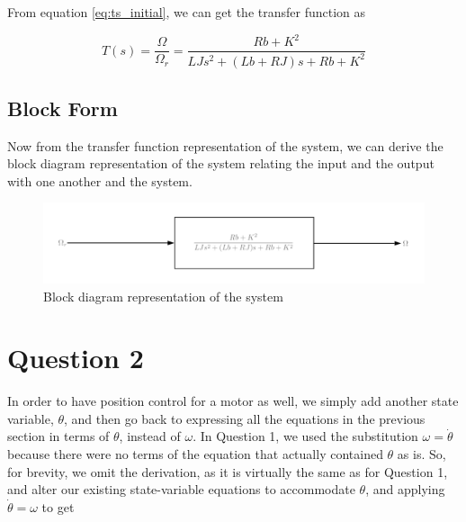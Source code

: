 \documentclass[a4paper, 12pt]{article}
\begin{document}
From equation \eqref{eq:ts_initial}, we can get the transfer function as

\begin{equation}
  T(s) = \frac{\Omega}{\Omega_r} = \frac{Rb + K^2}{LJs^2 + (Lb + RJ)s + Rb + K^2}
  \label{eq:ts_final}
\end{equation}

\subsection{Block Form}

Now from the transfer function representation of the system, we can derive the block diagram representation of the system relating the input and the output with one another and the system.

\begin{figure}[H]
  \centering
  \includegraphics[width=\textwidth]{Images/Question_1_3_Block_Diagram.png}
  \caption{Block diagram representation of the system}
  \label{fig:question_1_3_block_diagram}
\end{figure}


\section{Question 2}
In order to have position control for a motor as well, we simply add another
state variable, $\theta$, and then go back to expressing all the equations in
the previous section in terms of $\theta$, instead of $\omega$. In Question 1,
we used the substitution $\omega = \dot\theta$ because there were no terms of
the equation that actually contained $\theta$ as is. So, for brevity, we omit
the derivation, as it is virtually the same as for Question 1, and alter our
existing state-variable equations to accommodate $\theta$, and applying
$\dot\theta = \omega$ to get
\end{document}
